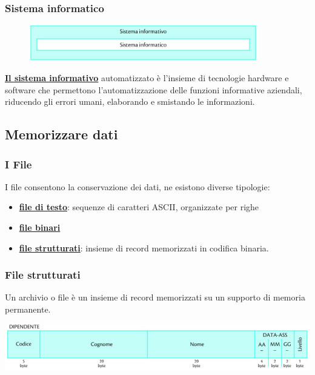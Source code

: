 \documentclass{article}
\begin{document}
\subsubsection{Sistema informatico}
\begin{figure}[h!]
    \centering
    \includegraphics[width=10cm]{Untitled picture1.png}
\end{figure}

\underline{\textbf{Il sistema informativo}} automatizzato è l'insieme di tecnologie hardware e software che permettono l'automatizzazione delle funzioni informative aziendali, riducendo gli errori umani, elaborando e smistando le informazioni.

\subsection{Memorizzare dati}
\subsubsection{I File}
I file consentono la conservazione dei dati, ne esistono diverse tipologie:
\begin{itemize}
    \item \textbf{\underline{file di testo}}: sequenze di caratteri ASCII, organizzate per righe 
    \item \textbf{\underline{file binari}}
    \item \textbf{\underline{file strutturati}}: insieme di record memorizzati in codifica binaria. 
\end{itemize}
\subsubsection{File strutturati}
Un archivio o file è un insieme di record memorizzati su un supporto di memoria permanente.

\begin{center}
    \includegraphics[h, scale=0.9]{rec.PNG}
\end{center}
\end{document}

